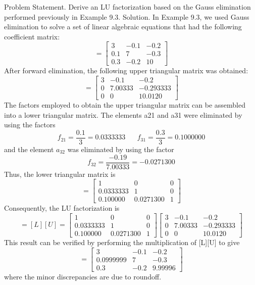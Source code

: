\documentclass[../main.tex]{subfiles}
\begin{document}
Problem Statement. Derive an LU factorization based on the Gauss elimination performed previously in Example 9.3.
Solution. In Example 9.3, we used Gauss elimination to solve a set of linear algebraic equations that had the following coefficient matrix:
\begin{equation}
[A]=\begin{bmatrix}
3 &-0.1  &-0.2 \\
0.1 &7  &-0.3 \\
0.3 &-0.2  & 10
\end{bmatrix}
\end{equation}
After forward elimination, the following upper triangular matrix was obtained:
\begin{equation}
[U]=\begin{bmatrix}
3 &-0.1  &-0.2 \\
0 &7.00333  &-0.293333 \\
0 &0  & 10.0120
\end{bmatrix}
\end{equation}
The factors employed to obtain the upper triangular matrix can be assembled into a lower triangular matrix. The elements a21 and a31 were eliminated by using the factors
\begin{equation}
f_{21}=\frac{0.1}{3}=0.0333333
\; \; \; \; \; \;
f_{31}=\frac{0.3}{3}=0.1000000
\end{equation}
and the element $a_{32}$ was eliminated by using the factor
\begin{equation}
f_{32}=\frac{-0.19}{7.00333}=-0.0271300
\end{equation}
Thus, the lower triangular matrix is
\begin{equation}
[L]=\begin{bmatrix}
1 &0  &0 \\
0.0333333 &1  &0 \\
0.100000 &0.0271300   & 1
\end{bmatrix}
\end{equation}
Consequently, the LU factorization is
\begin{equation}
[A]=[L][U]=\begin{bmatrix}
1 &0  &0 \\
0.0333333 &1  &0 \\
0.100000 &0.0271300   & 1
\end{bmatrix}
\begin{bmatrix}
3 &-0.1  &-0.2 \\
0 &7.00333  &-0.293333 \\
0 &0  & 10.0120
\end{bmatrix}
\end{equation}
This result can be verified by performing the multiplication of [L][U] to give
\begin{equation}
[L][U]=
\begin{bmatrix}
3 &-0.1  &-0.2 \\
0.0999999 &7  &-0.3 \\
0.3 &-0.2  & 9.99996
\end{bmatrix}
\end{equation}
where the minor discrepancies are due to roundoff.
\end{document}
